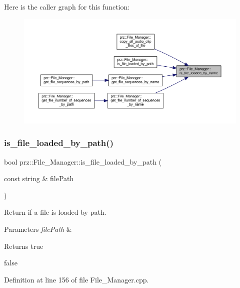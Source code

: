 Here is the caller graph for this function\+:
\nopagebreak
\begin{figure}[H]
\begin{center}
\leavevmode
\includegraphics[width=350pt]{classprz_1_1_file___manager_a57fba84490a328ce3b244198272be7f4_icgraph}
\end{center}
\end{figure}
\mbox{\label{classprz_1_1_file___manager_ab1b6f6447621351af16262236dad73b3}} 
\subsubsection{\texorpdfstring{is\_file\_loaded\_by\_path()}{is\_file\_loaded\_by\_path()}}
{\footnotesize\ttfamily bool prz\+::\+File\+\_\+\+Manager\+::is\+\_\+file\+\_\+loaded\+\_\+by\+\_\+path (\begin{DoxyParamCaption}\item[{const string \&}]{file\+Path }\end{DoxyParamCaption})}



Return if a file is loaded by path. 


\begin{DoxyParams}{Parameters}
{\em file\+Path} & \\
\hline
\end{DoxyParams}
\begin{DoxyReturn}{Returns}
true 

false 
\end{DoxyReturn}


Definition at line 156 of file File\+\_\+\+Manager.\+cpp.

